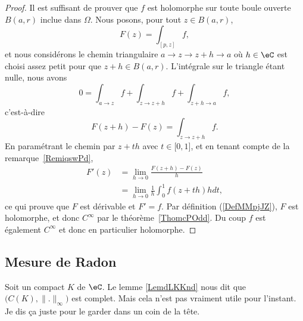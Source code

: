 \begin{proof}
	Il est suffisant de prouver que \( f\) est holomorphe sur toute boule ouverte \( B(a,r)\) inclue dans \( \Omega\). Nous posons, pour tout \( z\in B(a,r)\),
	\begin{equation}
		F(z)=\int_{[p,z]}f,
	\end{equation}
	et nous considérons le chemin triangulaire \( a\to z\to z+h\to a\) où \( h\in \eC\) est choisi assez petit pour que \( z+h\in B(a,r)\). L'intégrale sur le triangle étant nulle, nous avons
	\begin{equation}
		0=\int_{a\to z}f+\int_{z\to z+h}f+\int_{z+h\to a}f,
	\end{equation}
	c'est-à-dire
	\begin{equation}
		F(z+h)-F(z)=\int_{z\to z+h}f.
	\end{equation}
	En paramétrant le chemin par \( z+th\) avec \( t\in\mathopen[ 0 , 1 \mathclose]\), et en tenant compte de la remarque~\ref{RemiqswPd},
	\begin{subequations}
		\begin{align}
			F'(z) & =\lim_{h\to 0} \frac{ F(z+h)-F(z) }{ h }        \\
			      & =\lim_{h\to 0} \frac{1}{ h }\int_0^1f(z+th)hdt,
		\end{align}
	\end{subequations}
	ce qui prouve que \( F\) est dérivable et \( F'=f\). Par définition (\ref{DefMMpjJZ}), \( F\) est holomorphe, et donc \( C^{\infty}\) par le théorème~\ref{ThomcPOdd}. Du coup \( f\) est également \(  C^{\infty}\) et donc en particulier holomorphe.
\end{proof}

\subsection{Mesure de Radon}

Soit un compact \( K\) de \( \eC\).  Le lemme \ref{LemdLKKnd} nous dit que \( \big( C(K),\| . \|_{\infty} \big) \) est complet. Mais cela n'est pas vraiment utile pour l'instant. Je dis ça juste pour le garder dans un coin de la tête.


